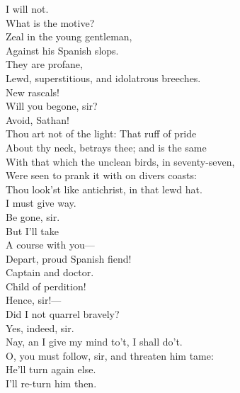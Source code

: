 \documentclass[a4paper,oneside]{memoir}
\begin{document}
\begin{drama*}
\kastrilspeaks {} I will not.\\
\ananiasspeaks What is the motive?\\
\subtlespeaks {} Zeal in the young gentleman,\\
Against his Spanish slops.\\
\ananiasspeaks {} They are profane,\\
Lewd, superstitious, and idolatrous breeches.\\
\surlyspeaks New rascals!\\
\kastrilspeaks {} Will you begone, sir?\\
\ananiasspeaks {} Avoid, Sathan!\\
Thou art not of the light: That ruff of pride\\
About thy neck, betrays thee; and is the same\\
With that which the unclean birds, in seventy-seven,\\
Were seen to prank it with on divers coasts:\\
Thou look'st like antichrist, in that lewd hat.\\
\surlyspeaks I must give way.\\
\kastrilspeaks {} Be gone, sir.\\
\surlyspeaks {} But I'll take\\
A course with you---\\
\ananiasspeaks {} Depart, proud Spanish fiend!\\
\surlyspeaks Captain and doctor.\\
\ananiasspeaks {} Child of perdition!\\
\kastrilspeaks Hence, sir!---\\
 Did I not quarrel bravely?\\
\facespeaks {} Yes, indeed, sir.\\
\kastrilspeaks Nay, an I give my mind to't, I shall do't.\\
\facespeaks O, you must follow, sir, and threaten him tame:\\
He'll turn again else.\\
\kastrilspeaks {} I'll re-turn him then.\\

\end{drama*}
\end{document}
